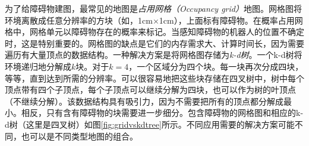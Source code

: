 
为了给障碍物建图，最常见的地图是\emph{占用网格（Occupancy grid）}地图。网格图将环境离散成任意分辨率的方块（如，1cm$\times$1cm），上面标有障碍物。在概率占用网格中，网格单元以障碍物存在的概率来标记。当感知障碍物的机器人的位置不确定时，这是特别重要的。网格图的缺点是它们的内存需求大、计算时间长，因为需要遍历有大量顶点的数据结构。一种解决方案是将网格图存储为\emph{k-d树}。一个k-d树将环境递归地分解成$k$块。对于$k = 4$，一个区域分为四个块。每一块再次分成四块，等等，直到达到所需的分辨率。可以很容易地把这些块存储在四叉树中，树中每个顶点带有四个子顶点，每个子顶点可以继续分解为四块，也可以作为树的叶顶点（不继续分解）。该数据结构具有吸引力，因为不需要把所有的顶点都分解成最小。相反，只有含有障碍物的块需要进一步细分。包含障碍物的网格图和相应的k-d树（这里是四叉树）如图\ref{fig:gridvskdtree}所示。不同应用需要的解决方案可能不同，也可以是不同类型地图的组合。


